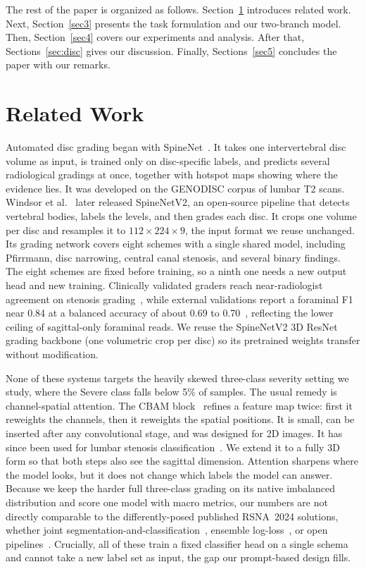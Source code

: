 \documentclass[runningheads]{llncs}
\begin{document}
The rest of the paper is organized as follows. Section~\ref{sec2} introduces related work. Next, Section~\ref{sec3} presents the task formulation and our two-branch model. Then, Section~\ref{sec4} covers our experiments and analysis. After that, Sections~\ref{sec:disc} gives our discussion. Finally, Sections~\ref{sec5} concludes the paper with our remarks.

\section{Related Work}\label{sec2}

Automated disc grading began with SpineNet~\cite{jamaludin2017}. It takes one intervertebral disc volume as input, is trained only on disc-specific labels, and predicts several radiological gradings at once, together with hotspot maps showing where the evidence lies. It was developed on the GENODISC corpus of lumbar T2 scans. Windsor et al.~\cite{windsor2022} later released SpineNetV2, an open-source pipeline that detects vertebral bodies, labels the levels, and then grades each disc. It crops one volume per disc and resamples it to $112\times224\times9$, the input format we reuse unchanged. Its grading network covers eight schemes with a single shared model, including Pfirrmann, disc narrowing, central canal stenosis, and several binary findings. The eight schemes are fixed before training, so a ninth one needs a new output head and new training. Clinically validated graders reach near-radiologist agreement on stenosis grading~\cite{hallinan2021}, while external validations report a foraminal F1 near 0.84 at a balanced accuracy of about 0.69 to 0.70~\cite{mcsweeney2023,nigru2024}, reflecting the lower ceiling of sagittal-only foraminal reads. We reuse the SpineNetV2 3D ResNet grading backbone (one volumetric crop per disc) so its pretrained weights transfer without modification.

None of these systems targets the heavily skewed three-class severity setting we study, where the Severe class falls below 5\% of samples. The usual remedy is channel-spatial attention. The CBAM block~\cite{woo2018cbam} refines a feature map twice: first it reweights the channels, then it reweights the spatial positions. It is small, can be inserted after any convolutional stage, and was designed for 2D images. It has since been used for lumbar stenosis classification~\cite{lin2024cbam}. We extend it to a fully 3D form so that both steps also see the sagittal dimension. Attention sharpens where the model looks, but it does not change which labels the model can answer. Because we keep the harder full three-class grading on its native imbalanced distribution and score one model with macro metrics, our numbers are not directly comparable to the differently-posed published RSNA~2024 solutions, whether joint segmentation-and-classification~\cite{aktan2025}, ensemble log-loss~\cite{kaggle2024}, or open pipelines~\cite{nshen2024}. Crucially, all of these train a fixed classifier head on a single schema and cannot take a new label set as input, the gap our prompt-based design fills.
\end{document}
